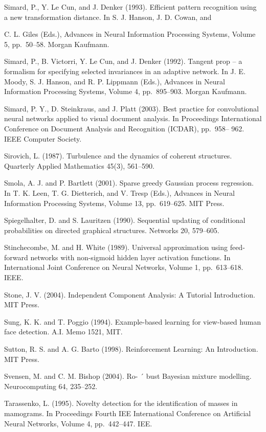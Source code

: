 \documentclass[
  10
]{article}
\begin{document}
Simard, P., Y. Le Cun, and J. Denker (1993). Efficient pattern
recognition using a new transformation distance. In S. J. Hanson, J. D.
Cowan, and

C. L. Giles (Eds.), Advances in Neural Information Processing Systems,
Volume 5, pp.~50--58. Morgan Kaufmann.

Simard, P., B. Victorri, Y. Le Cun, and J. Denker (1992). Tangent prop
-- a formalism for specifying selected invariances in an adaptive
network. In J. E. Moody, S. J. Hanson, and R. P. Lippmann (Eds.),
Advances in Neural Information Processing Systems, Volume 4,
pp.~895--903. Morgan Kaufmann.

Simard, P. Y., D. Steinkraus, and J. Platt (2003). Best practice for
convolutional neural networks applied to visual document analysis. In
Proceedings International Conference on Document Analysis and
Recognition (ICDAR), pp.~958-- 962. IEEE Computer Society.

Sirovich, L. (1987). Turbulence and the dynamics of coherent structures.
Quarterly Applied Mathematics 45(3), 561--590.

Smola, A. J. and P. Bartlett (2001). Sparse greedy Gaussian process
regression. In T. K. Leen, T. G. Dietterich, and V. Tresp (Eds.),
Advances in Neural Information Processing Systems, Volume 13,
pp.~619--625. MIT Press.

Spiegelhalter, D. and S. Lauritzen (1990). Sequential updating of
conditional probabilities on directed graphical structures. Networks 20,
579--605.

Stinchecombe, M. and H. White (1989). Universal approximation using
feed-forward networks with non-sigmoid hidden layer activation
functions. In International Joint Conference on Neural Networks, Volume
1, pp.~613--618. IEEE.

Stone, J. V. (2004). Independent Component Analysis: A Tutorial
Introduction. MIT Press.

Sung, K. K. and T. Poggio (1994). Example-based learning for view-based
human face detection. A.I. Memo 1521, MIT.

Sutton, R. S. and A. G. Barto (1998). Reinforcement Learning: An
Introduction. MIT Press.

Svensen, M. and C. M. Bishop (2004). Ro- ´ bust Bayesian mixture
modelling. Neurocomputing 64, 235--252.

Tarassenko, L. (1995). Novelty detection for the identification of
masses in mamograms. In Proceedings Fourth IEE International Conference
on Artificial Neural Networks, Volume 4, pp.~442--447. IEE.
\end{document}

